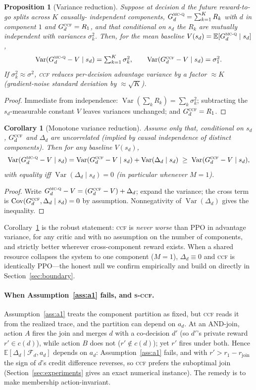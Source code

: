 \documentclass[review,authoryear,3p,times]{elsarticle}
\newtheorem{proposition}{Proposition}
\newtheorem{corollary}{Corollary}
\newcommand{\ccf}{\textsc{ccf}}
\newcommand{\sccf}{\textsc{s-ccf}}
\newcommand{\mcq}{\textsc{mc-q}}
\newcommand{\Fscr}{\mathcal{F}}
\newcommand{\Ex}{\mathbb{E}}
\newcommand{\Var}{\operatorname{Var}}
\newcommand{\Cov}{\operatorname{Cov}}
\begin{document}
\begin{proposition}[Variance reduction]\label{prop:var}
Suppose at decision $d$ the future reward-to-go splits across $K$ causally-
independent components, $G_d^{\mcq}=\sum_{k=1}^{K}R_k$ with $d$ in component $1$
and $G_d^{\ccf}=R_1$, and that conditional on $s_d$ the $R_k$ are mutually
independent with variances $\sigma_k^2$. Then, for the mean baseline
$V(s_d)=\Ex[G_d^{\mcq}\mid s_d]$,
\[
\Var(G_d^{\mcq}-V\mid s_d)=\textstyle\sum_{k=1}^K\sigma_k^2,
\qquad
\Var(G_d^{\ccf}-V\mid s_d)=\sigma_1^2.
\]
If $\sigma_k^2\approx\sigma^2$, \ccf{} reduces per-decision advantage variance by
a factor $\approx K$ (gradient-noise standard deviation by $\approx\sqrt K$).
\end{proposition}
\begin{proof}
Immediate from independence: $\Var(\sum_k R_k)=\sum_k\sigma_k^2$; subtracting the
$s_d$-measurable constant $V$ leaves variances unchanged; and $G_d^{\ccf}=R_1$.
\end{proof}

\begin{corollary}[Monotone variance reduction]\label{cor:mono}
Assume only that, conditional on $s_d$, $G_d^{\ccf}$ and $\Delta_d$ are
uncorrelated (implied by causal independence of distinct components). Then for
\emph{any} baseline $V(s_d)$,
\[
\Var(G_d^{\mcq}-V\mid s_d)=\Var(G_d^{\ccf}-V\mid s_d)+\Var(\Delta_d\mid s_d)
\;\ge\;\Var(G_d^{\ccf}-V\mid s_d),
\]
with equality iff $\Var(\Delta_d\mid s_d)=0$ (in particular whenever $M=1$).
\end{corollary}
\begin{proof}
Write $G_d^{\mcq}-V=(G_d^{\ccf}-V)+\Delta_d$; expand the variance; the cross term
is $\Cov(G_d^{\ccf},\Delta_d\mid s_d)=0$ by assumption. Nonnegativity of
$\Var(\Delta_d)$ gives the inequality.
\end{proof}

Corollary~\ref{cor:mono} is the robust statement: \ccf{} is \emph{never worse}
than PPO in advantage variance, for any critic and with no assumption on the
number of components, and strictly better wherever cross-component reward exists.
When a shared resource collapses the system to one component ($M=1$),
$\Delta_d\equiv0$ and \ccf{} is identically PPO---the honest null we confirm
empirically and build on directly in Section~\ref{sec:boundary}.

\paragraph{When Assumption~\ref{ass:a1} fails, and \sccf.} Assumption~\ref{ass:a1}
treats the component partition as fixed, but \ccf{} reads it from the realized
trace, and the partition can depend on $a_d$. At an AND-join, action $A$ fires
the join and merges $d$ with a co-decision $d'$ (so $d'$'s private reward
$r'\in c(d)$), while action $B$ does not ($r'\notin c(d)$); yet $r'$ fires under
both. Hence $\Ex[\Delta_d\mid\Fscr_d,a_d]$ depends on $a_d$: Assumption~\ref{ass:a1}
fails, and with $r'>r_1-r_{\text{join}}$ the sign of $d$'s credit difference
reverses, so \ccf{} prefers the suboptimal join (Section~\ref{sec:experiments}
gives an exact numerical instance). The remedy is to make membership
action-invariant.
\end{document}
